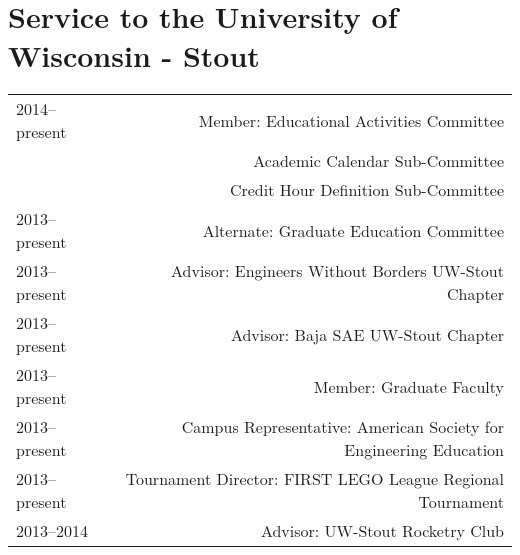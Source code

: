 \section*{Service to the University of Wisconsin - Stout}
\begin{tabular}{L!{\VRule}R}
2014--present&Member: Educational Activities Committee \\
 &Academic Calendar Sub-Committee \\
 &Credit Hour Definition Sub-Committee \\
2013--present&Alternate: Graduate Education Committee \\
2013--present&Advisor: Engineers Without Borders UW-Stout Chapter \\
2013--present&Advisor: Baja SAE UW-Stout Chapter \\
2013--present&Member: Graduate Faculty \\
2013--present&Campus Representative: American Society for Engineering Education\\
2013--present&Tournament Director: FIRST LEGO League Regional Tournament\\
2013--2014&Advisor: UW-Stout Rocketry Club\\
\end{tabular}